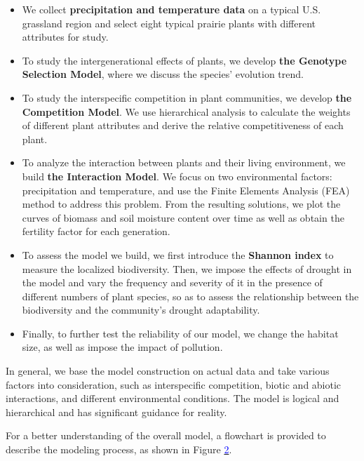 \documentclass{mcmthesis}
\begin{document}
\begin{itemize}
\item We collect \textbf{precipitation and temperature data} on a typical U.S. grassland region and select eight typical prairie plants with different attributes for study.

\item To study the intergenerational effects of plants, we develop \textbf{the Genotype Selection Model}, where we discuss the species' evolution trend.

\item To study the interspecific competition in plant communities, we develop \textbf{the Competition Model}. We use hierarchical analysis to calculate the weights of different plant attributes and derive the relative competitiveness of each plant.

\item To analyze the interaction between plants and their living environment, we build \textbf{the Interaction Model}. We focus on two environmental factors: precipitation and temperature, and use the Finite Elements Analysis (FEA) method to address this problem. From the resulting solutions, we plot the curves of biomass and soil moisture content over time as well as obtain the fertility factor for each generation.

\item To assess the model we build, we first introduce the \textbf{Shannon index} to measure the localized biodiversity. Then, we impose the effects of drought in the model and vary the frequency and severity of it in the presence of different numbers of plant species, so as to assess the relationship between the biodiversity and the community's drought adaptability.

\item Finally, to further test the reliability of our model, we change the habitat size, as well as impose the impact of pollution.

\end{itemize}

In general, we base the model construction on actual data and take various factors into consideration, such as interspecific competition, biotic and abiotic interactions, and different environmental conditions. The model is logical and hierarchical and has significant guidance for reality.

For a better understanding of the overall model, a flowchart is provided to describe the modeling process, as shown in Figure \hyperref[fig:model]{\textcolor{blue}{2}}.
\end{document}
